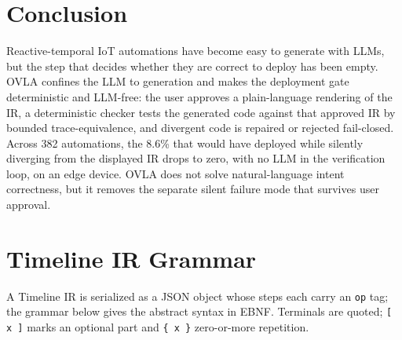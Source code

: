 \documentclass[sigconf,nonacm,anonymous,review]{acmart}
\begin{document}
\section{Conclusion}

Reactive-temporal IoT automations have become easy to generate with LLMs, but the step that decides whether they are correct to deploy has been empty. OVLA confines the LLM to generation and makes the deployment gate deterministic and LLM-free: the user approves a plain-language rendering of the IR, a deterministic checker tests the generated code against that approved IR by bounded trace-equivalence, and divergent code is repaired or rejected fail-closed. Across 382 automations, the 8.6\% that would have deployed while silently diverging from the displayed IR drops to zero, with no LLM in the verification loop, on an edge device. OVLA does not solve natural-language intent correctness, but it removes the separate silent failure mode that survives user approval.

\balance



\appendix

\section{Timeline IR Grammar}
\label{app:grammar}

A Timeline IR is serialized as a JSON object whose steps each carry an \texttt{op} tag; the grammar below gives the abstract syntax in EBNF. Terminals are quoted; \texttt{[\,x\,]} marks an optional part and \texttt{\{\,x\,\}} zero-or-more repetition.
\end{document}

